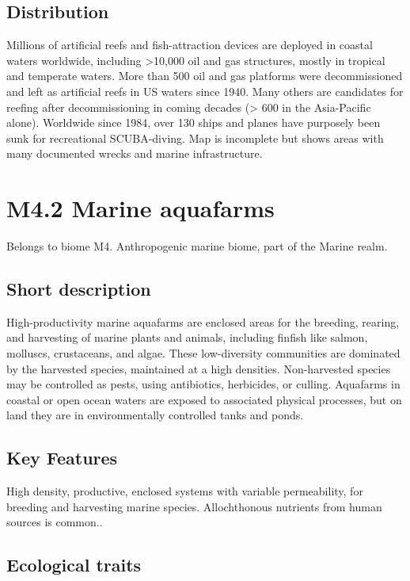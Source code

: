 \documentclass[
  letterpaper,
  DIV=11,
  numbers=noendperiod]{scrartcl}
\begin{document}
\subsection{Distribution}\label{distribution-47}

Millions of artificial reefs and fish-attraction devices are deployed in
coastal waters worldwide, including \textgreater10,000 oil and gas
structures, mostly in tropical and temperate waters. More than 500 oil
and gas platforms were decommissioned and left as artificial reefs in US
waters since 1940. Many others are candidates for reefing after
decommissioning in coming decades (\textgreater{} 600 in the
Asia-Pacific alone). Worldwide since 1984, over 130 ships and planes
have purposely been sunk for recreational SCUBA-diving. Map is
incomplete but shows areas with many documented wrecks and marine
infrastructure.

\section{M4.2 Marine aquafarms}\label{m4.2-marine-aquafarms}

Belongs to biome M4. Anthropogenic marine biome, part of the Marine
realm.

\subsection{Short description}\label{short-description-48}

High-productivity marine aquafarms are enclosed areas for the breeding,
rearing, and harvesting of marine plants and animals, including finfish
like salmon, molluscs, crustaceans, and algae. These low-diversity
communities are dominated by the harvested species, maintained at a high
densities. Non-harvested species may be controlled as pests, using
antibiotics, herbicides, or culling. Aquafarms in coastal or open ocean
waters are exposed to associated physical processes, but on land they
are in environmentally controlled tanks and ponds.

\subsection{Key Features}\label{key-features-48}

High density, productive, enclosed systems with variable permeability,
for breeding and harvesting marine species. Allochthonous nutrients from
human sources is common..

\subsection{Ecological traits}\label{ecological-traits-48}
\end{document}
